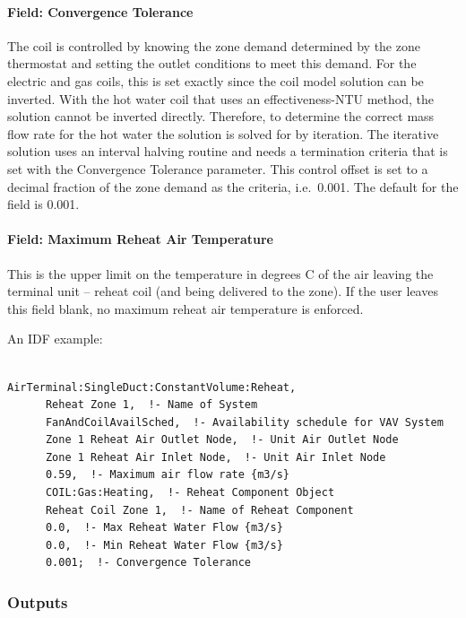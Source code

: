 \paragraph{Field: Convergence Tolerance}\label{field-convergence-tolerance}

The coil is controlled by knowing the zone demand determined by the zone thermostat and setting the outlet conditions to meet this demand. For the electric and gas coils, this is set exactly since the coil model solution can be inverted. With the hot water coil that uses an effectiveness-NTU method, the solution cannot be inverted directly. Therefore, to determine the correct mass flow rate for the hot water the solution is solved for by iteration. The iterative solution uses an interval halving routine and needs a termination criteria that is set with the Convergence Tolerance parameter. This control offset is set to a decimal fraction of the zone demand as the criteria, i.e.~0.001. The default for the field is 0.001.

\paragraph{Field: Maximum Reheat Air Temperature}\label{field-maximum-reheat-air-temperature}

This is the upper limit on the temperature in degrees C of the air leaving the terminal unit -- reheat coil (and being delivered to the zone). If the user leaves this field blank, no maximum reheat air temperature is enforced.

An IDF example:

\begin{lstlisting}

AirTerminal:SingleDuct:ConstantVolume:Reheat,
      Reheat Zone 1,  !- Name of System
      FanAndCoilAvailSched,  !- Availability schedule for VAV System
      Zone 1 Reheat Air Outlet Node,  !- Unit Air Outlet Node
      Zone 1 Reheat Air Inlet Node,  !- Unit Air Inlet Node
      0.59,  !- Maximum air flow rate {m3/s}
      COIL:Gas:Heating,  !- Reheat Component Object
      Reheat Coil Zone 1,  !- Name of Reheat Component
      0.0,  !- Max Reheat Water Flow {m3/s}
      0.0,  !- Min Reheat Water Flow {m3/s}
      0.001;  !- Convergence Tolerance
\end{lstlisting}

\subsubsection{Outputs}\label{outputs-1-000}

